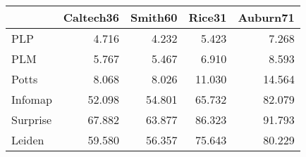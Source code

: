 \begin{tabular}{lrrrr}
\toprule
{} & Caltech36 & Smith60 & Rice31 & Auburn71 \\
\midrule
PLP      &     4.716 &   4.232 &  5.423 &    7.268 \\
PLM      &     5.767 &   5.467 &  6.910 &    8.593 \\
Potts    &     8.068 &   8.026 & 11.030 &   14.564 \\
Infomap  &    52.098 &  54.801 & 65.732 &   82.079 \\
Surprise &    67.882 &  63.877 & 86.323 &   91.793 \\
Leiden   &    59.580 &  56.357 & 75.643 &   80.229 \\
\bottomrule
\end{tabular}
